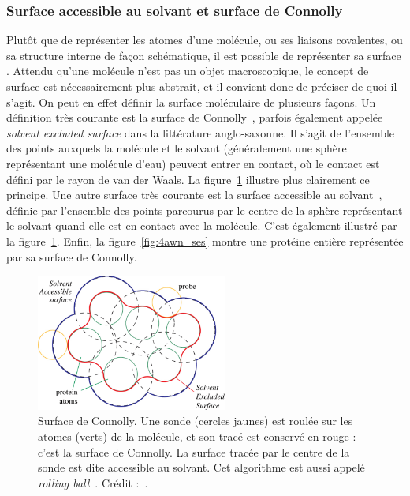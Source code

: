 \begin{appendices}
	\subsubsection{Surface accessible au solvant et surface de Connolly}
	Plutôt que de représenter les atomes d'une molécule, ou ses liaisons covalentes, ou sa structure interne de façon schématique, il est possible de représenter sa \og surface \fg{}. Attendu qu'une molécule n'est pas un objet macroscopique, le concept de surface est nécessairement plus abstrait, et il convient donc de préciser de quoi il s'agit. On peut en effet définir la surface moléculaire de plusieurs façons. Un définition très courante est la surface de Connolly~\cite{connolly1983analytical}, parfois également appelée \emph{solvent excluded surface} dans la littérature anglo-saxonne. Il s'agit de l'ensemble des points auxquels la molécule et \og le solvant \fg{} (généralement une sphère représentant une molécule d'eau) peuvent entrer en contact, où le contact est défini par le rayon de van der Waals. La figure~\ref{fig:connolly} illustre plus clairement ce principe. Une autre surface très courante est la surface accessible au solvant~\cite{lee1971interpretation}, définie par l'ensemble des points parcourus par le centre de la sphère représentant le solvant quand elle est en contact avec la molécule. C'est également illustré par la figure~\ref{fig:connolly}. Enfin, la figure~\ref{fig:4awn_ses} montre une protéine entière représentée par sa surface de Connolly.
	
	\begin{figure}[htbp]
		\centering
		\includegraphics[width=0.56\textwidth]{figures/ch1/connolly}
		\caption[Surface de Connolly et accessible au solvant]{Surface de Connolly. Une sonde (cercles jaunes) est \og roulée \fg{} sur les atomes (verts) de la molécule, et son tracé est conservé en rouge : c'est la surface de Connolly. La surface tracée par le centre de la sonde est dite accessible au solvant. Cet algorithme est aussi appelé \emph{rolling ball}~\cite{shrake1973environment, connolly1983analytical, connolly1993molecular}. Crédit :~\cite{krone2009interactive}.}
		\label{fig:connolly}
	\end{figure}
		

\end{appendices}
